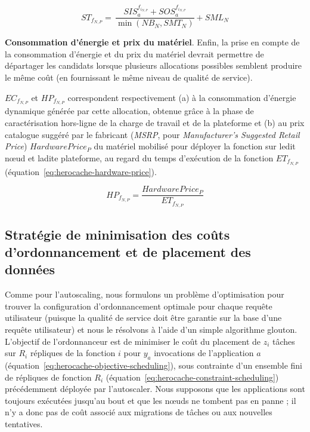 \begin{equation}
    {ST}_{{f}_{N, P}} = \, \frac{SIS_{a}^{f_{i_{N, P}}} + SOS_{a}^{f_{i_{N, P}}}}{\min (NB_{N}, SMT_{N})} + SML_{N}
\label{eq:herocache-storage-time}
\end{equation}

\textbf{Consommation d'énergie et prix du matériel}. Enfin, la prise en compte de la consommation d'énergie et du prix du matériel devrait permettre de départager les candidats lorsque plusieurs allocations possibles semblent produire le même coût (en fournissant le même niveau de qualité de service).

${EC}_{{f}_{N, P}}$ et ${HP}_{{f}_{N, P}}$ correspondent respectivement (a) à la consommation d'énergie dynamique générée par cette allocation, obtenue grâce à la phase de caractérisation hors-ligne de la charge de travail et de la plateforme et (b) au prix catalogue suggéré par le fabricant (\textit{MSRP}, pour \textit{Manufacturer's Suggested Retail Price}) $Hardware Price_{P}$ du matériel mobilisé pour déployer la fonction sur ledit nœud et ladite plateforme, au regard du temps d'exécution de la fonction $ET_{{f}_{N, P}}$ (équation~\ref{eq:herocache-hardware-price}).

\begin{equation}
    {HP}_{{f}_{N, P}} = \frac{Hardware Price_{P}}{ET_{{f}_{N, P}}}
\label{eq:herocache-hardware-price}
\end{equation}

\subsection{Stratégie de minimisation des coûts d'ordonnancement et de placement des données}

Comme pour l'autoscaling, nous formulons un problème d'optimisation pour trouver la configuration d'ordonnancement optimale pour chaque requête utilisateur (puisque la qualité de service doit être garantie sur la base d'une requête utilisateur) et nous le résolvons à l'aide d'un simple algorithme glouton. L'objectif de l'ordonnanceur est de minimiser le coût du placement de $z_i$ tâches sur $R_i$ répliques de la fonction $i$ pour $y_a$ invocations de l'application $a$ (équation~\ref{eq:herocache-objective-scheduling}), sous contrainte d'un ensemble fini de répliques de fonction $R_{i}$ (équation~\ref{eq:herocache-constraint-scheduling}) précédemment déployée par l'autoscaler. Nous supposons que les applications sont toujours exécutées jusqu'au bout et que les nœuds ne tombent pas en panne ; il n'y a donc pas de coût associé aux migrations de tâches ou aux nouvelles tentatives.

